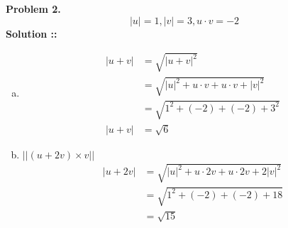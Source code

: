 \documentclass[11pt]{article}
\begin{document}

\textbf{Problem 2.}
$$|u| = 1, |v| = 3, u\cdot v = -2$$
\vspace{5px}\textbf{Solution ::}
\begin{enumerate}[a)]
\item 
\begin{align}
    |u + v| &= \sqrt{|u+v|^2} \\
    &= \sqrt{|u|^2 + u\cdot v+u\cdot v+|v|^2} \\
    &= \sqrt{1^2 + (-2)+(-2)+3^2} \\
    |u+v| &= \sqrt{6}
\end{align}

\item $||(u+2v)\times v||$
\begin{align}
    |u+2v| &= \sqrt{|u|^2+u\cdot 2v+u\cdot2v+2|v|^2} \\
    &= \sqrt{1^2 + (-2) + (-2) + 18} \\
    &= \sqrt{15}
\end{align}
\end{enumerate}
\end{document}
